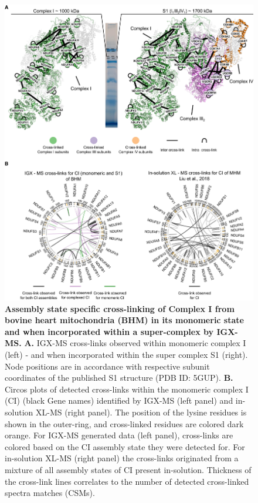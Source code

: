 \begin{subappendices}
    \begin{figure}[hbt!]
        \center
        \includegraphics[width=\textwidth]{Chapter.2/Figures/SI_EV_1.jpg} 
        \caption{\textbf{Assembly state specific cross-linking of Complex I from bovine heart mitochondria (BHM) in its monomeric state and when incorporated within a super-complex by IGX-MS.} \textbf{A.} IGX-MS cross-links observed within monomeric complex I (left) - and when incorporated within the super complex S1 (right). Node positions are in accordance with respective subunit coordinates of the published S1 structure (PDB ID: 5GUP). \textbf{B.} Circos plots of detected cross-links within the monomeric complex I (CI) (black Gene names) identified by IGX-MS (left panel) and in-solution XL-MS (right panel). The position of the lysine residues is shown in the outer-ring, and cross-linked residues are colored dark orange. For IGX-MS generated data (left panel), cross-links are colored based on the CI assembly state they were detected for. For in-solution XL-MS (right panel) the cross-links originated from a mixture of all assembly states of CI present in-solution. Thickness of the cross-link lines correlates to the number of detected cross-linked spectra matches (CSMs).}
        \label{fig:ch2_app_fig5}
    \end{figure}


\end{subappendices}

